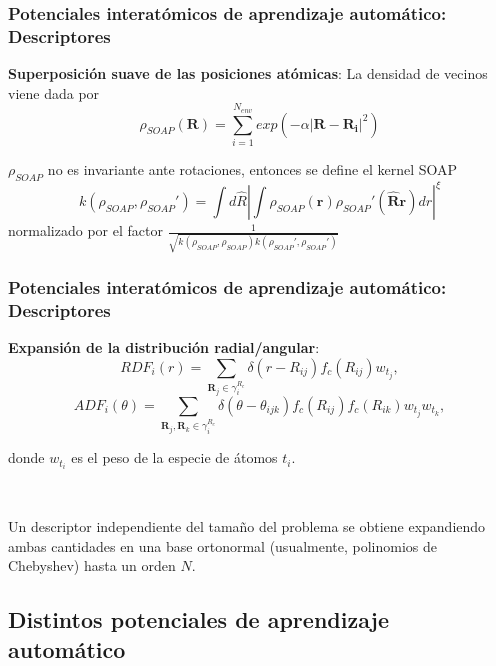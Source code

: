 \documentclass[aspectratio=169]{beamer}
\let\oldtextbf\textbf
\renewcommand{\textbf}[1]{\textcolor{nordblue}{\oldtextbf{#1}}}
\begin{document}
    \begin{frame}
        \frametitle{Potenciales interatómicos de aprendizaje automático: Descriptores}

        \textbf{Superposición suave de las posiciones atómicas}: La densidad
        de vecinos viene dada por
        $$
        \rho_{SOAP}(\mathbf{R}) = \sum_{i=1}^{N_{env}} exp(-\alpha |\mathbf{R} - \mathbf{R_i}|^2)
        $$

        \pause

        $\rho_{SOAP}$ no es invariante ante rotaciones, entonces se define el 
        kernel SOAP
        $$
        k(\rho_{SOAP}, \rho_{SOAP}') = \int d\hat{R} \left|\int \rho_{SOAP}(\mathbf{r}) \rho_{SOAP}'(\mathbf{\hat{R}r}) dr \right|^{\xi}
        $$
        normalizado por el factor $\frac{1}{\sqrt{k(\rho_{SOAP}, \rho_{SOAP}) k(\rho_{SOAP}', \rho_{SOAP}')}}$

    \end{frame}

    \begin{frame}
        \frametitle{Potenciales interatómicos de aprendizaje automático: Descriptores}

        \textbf{Expansión de la distribución radial/angular}:
        $$
        RDF_i(r) = \sum_{\mathbf{R}_j \in \gamma_i^{R_c}} \delta(r - R_{ij}) f_c(R_{ij}) w_{t_j},
        $$
        $$
        ADF_i(\theta) = \sum_{\mathbf{R}_j, \mathbf{R}_k \in \gamma_i^{R_c}} \delta(\theta - \theta_{ijk}) f_c(R_{ij}) f_c(R_{ik}) w_{t_j} w_{t_k},
        $$

        donde $w_{t_i}$ es el peso de la especie de átomos $t_i$.
        
        \ \pause

        Un descriptor independiente del tamaño del problema se obtiene expandiendo
        ambas cantidades en una base ortonormal (usualmente, polinomios de 
        Chebyshev) hasta un orden $N$.

    \end{frame}
    
    \subsection{Distintos potenciales de aprendizaje automático}
\end{document}
